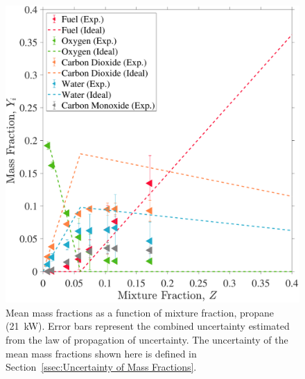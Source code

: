 \documentclass[12pt]{article}
\begin{document}
\begin{figure}[!]
	\centering
\includegraphics[width=\textwidth,keepaspectratio]{Adjusted_FuelPropane 21KW_Mixture_Fraction_Intermediate_Plot.pdf}
	\caption[Mean mass fractions as a function of mixture fraction, propane (21~kW)]{Mean mass fractions as a function of mixture fraction, propane (21~kW). Error bars represent the combined uncertainty estimated from the law of propagation of uncertainty. The uncertainty of the mean mass fractions shown here is defined in Section~\ref{ssec:Uncertainty of Mass Fractions}.}
	\label{fig:Propane20kW_Mix_Frac}
\end{figure}
\end{document}
